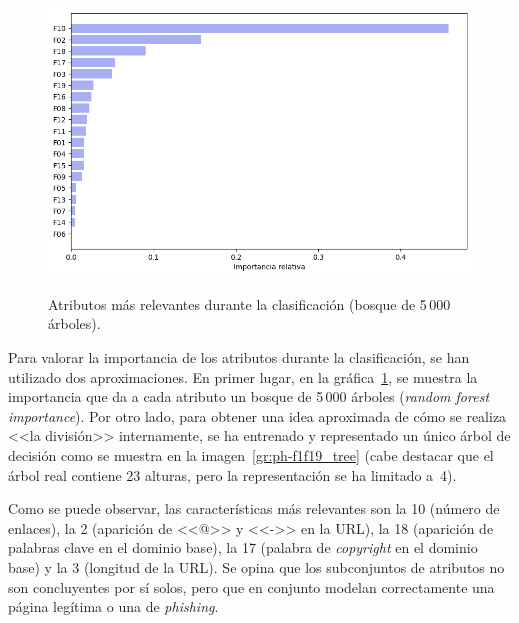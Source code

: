\begin{figure}[h]
	\caption[\textit{Phishing}: detección (\texttt{f1-f19}, atributos relevantes RFI)]{Atributos más relevantes durante la clasificación (bosque de 5\,000 árboles).}
	\centering
	\includegraphics[width=\textwidth]{../img/memoria/5_phishing/f1f19_rfi}
	\label{gr:ph-f1f19_rfi}
\end{figure}

Para valorar la importancia de los atributos durante la clasificación, se han utilizado dos aproximaciones. En primer lugar, en la gráfica~\ref{gr:ph-f1f19_rfi}, se muestra la importancia que da a cada atributo un bosque de 5\,000 árboles (\textit{random forest importance}). Por otro lado, para obtener una idea aproximada de cómo se realiza <<la división>> internamente, se ha entrenado y representado un único árbol de decisión como se muestra en la imagen~\ref{gr:ph-f1f19_tree} (cabe destacar que el árbol real contiene 23 alturas, pero la representación se ha limitado a~4).

Como se puede observar, las características más relevantes son la 10 (número de enlaces), la 2 (aparición de <<@>> y <<->> en la URL), la 18 (aparición de palabras clave en el dominio base), la 17 (palabra de \textit{copyright} en el dominio base) y la 3 (longitud de la URL). Se opina que los subconjuntos de atributos no son concluyentes por sí solos, pero que en conjunto modelan correctamente una página legítima o una de \textit{phishing}.

